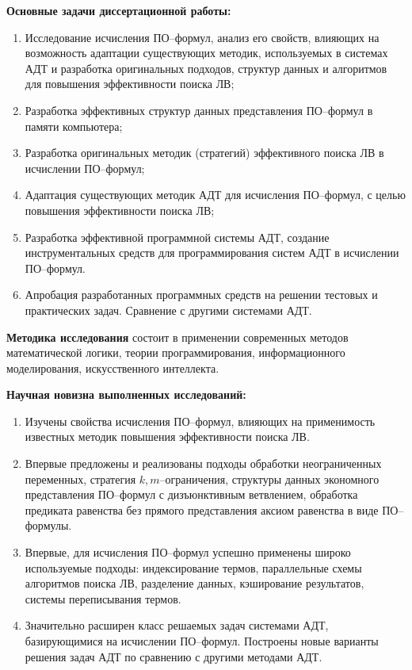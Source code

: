 \documentclass[a4paper]{report}
\begin{document}
\textbf{Основные задачи диссертационной работы:}
\begin{enumerate}
\item Исследование исчисления ПО--формул, анализ его свойств, влияющих на возможность адаптации существующих методик, используемых в системах АДТ и разработка оригинальных подходов, структур данных и алгоритмов для повышения эффективности поиска ЛВ;
\item Разработка эффективных структур данных представления ПО--формул в памяти компьютера;
\item Разработка оригинальных методик (стратегий) эффективного поиска ЛВ в исчислении ПО--формул;
\item Адаптация существующих методик АДТ для исчисления ПО--формул, с целью повышения эффективности поиска ЛВ;
\item Разработка эффективной программной системы АДТ, создание инструментальных средств для программирования систем АДТ в исчислении ПО--формул.
\item Апробация разработанных программных средств на решении тестовых и практических задач. Сравнение с другими системами АДТ.
\end{enumerate}

\textbf{Методика исследования} состоит в применении современных методов математической логики, теории программирования, информационного моделирования, искусственного интеллекта.


\textbf{Научная новизна выполненных исследований:}
\begin{enumerate}
\item Изучены свойства исчисления ПО--формул, влияющих на применимость известных методик повышения эффективности поиска ЛВ.
\item Впервые предложены и реализованы подходы обработки неограниченных переменных, стратегия $k,m$--ограничения, структуры данных экономного представления ПО--формул с дизъюнктивным ветвлением, обработка предиката равенства без прямого представления аксиом равенства в виде ПО--формулы.
\item Впервые, для исчисления ПО--формул успешно применены широко используемые подходы: индексирование термов, параллельные схемы алгоритмов поиска ЛВ, разделение данных, кэширование результатов, системы переписывания термов.
\item Значительно расширен класс решаемых задач системами АДТ, базирующимися на исчислении ПО--формул. Построены новые варианты решения задач АДТ по сравнению с другими методами АДТ.
\end{enumerate}
\end{document}
